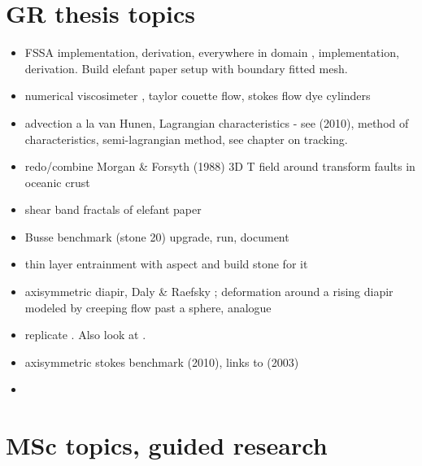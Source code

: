 \documentclass[a4paper]{article}
\begin{document}
\section{GR thesis topics}
\begin{itemize} 
\item FSSA implementation, derivation, everywhere in domain \cite{sctc20}, implementation, derivation. Build elefant paper
      setup with boundary fitted mesh.
\item numerical viscosimeter \cite{batt84}, taylor couette flow, stokes flow dye cylinders
\item advection a la van Hunen, Lagrangian characteristics - see \textcite{bepo10} (2010), method 
      of characteristics, semi-lagrangian method, see chapter on tracking.
\item redo/combine Morgan \& Forsyth (1988) \cite{mofo88} 3D T field around transform faults in oceanic crust
\item shear band fractals of elefant paper
\item Busse benchmark (stone 20) upgrade, run, document
\item thin layer entrainment with aspect and build stone for it 
\item axisymmetric diapir, Daly \& Raefsky \cite{dara85}; deformation around a rising diapir modeled by creeping 
      flow past a sphere, analogue \cite{crud88}
\item replicate \textcite{khfh15} . Also look at \textcite{khmo21}.
\item axisymmetric stokes benchmark \textcite{lezh10} (2010), links to \textcite{zhha03} (2003)
\item 
\end{itemize}





\newpage
\section{MSc topics, guided research}
\end{document}
